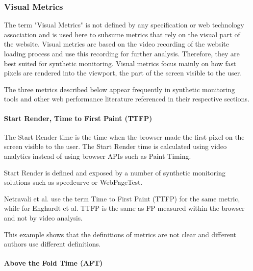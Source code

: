
\subsubsection{Visual Metrics} %
\label{subsubsection:visual_metrics}

The term "Visual Metrics" is not defined by any specification or web technology association and is used here to subsume metrics that rely on the visual part of the website.
Visual metrics are based on the video recording of the website loading process and use this recording for further analysis.
Therefore, they are best suited for synthetic monitoring.
Visual metrics focus mainly on how fast pixels are rendered into the viewport, the part of the screen visible to the user.

The three metrics described below appear frequently in synthetic monitoring tools and other web performance literature referenced in their respective sections.



\paragraph{Start Render, Time to First Paint (TTFP)} %

The Start Render time is the time when the browser made the first pixel on the screen visible to the user.
The Start Render time is calculated using video analytics instead of using browser APIs such as Paint Timing.

Start Render is defined and exposed by a number of synthetic monitoring solutions such as speedcurve or WebPageTest.

Netravali et al. use the term Time to First Paint (TTFP) for the same metric, %
while for Enghardt et al. TTFP is the same as FP measured within the browser and not by video analysis. %

This example shows that the definitions of metrics are not clear and different authors use different definitions.



\paragraph{Above the Fold Time (AFT)} %

